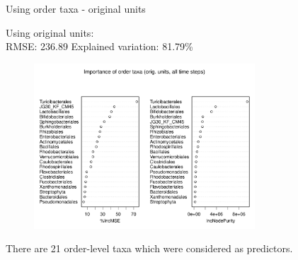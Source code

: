 \documentclass{beamer}
\begin{document}
\begin{frame}{Using order taxa - original units}

  {\scriptsize
    
  \noindent Using original units:\\
  RMSE: 236.89  \hspace{0.05in}  Explained variation: 81.79\%

  \begin{center}
    \begin{figure}
      \includegraphics[width=3.25in]{../only_orders/all_time_steps/orig_units_all_data_orders_imp_plot}
    \end{figure}
  \end{center}
  \vspace{-0.25in}

\noindent There are 21 order-level taxa which were considered as predictors.
}

\end{frame}
\end{document}
